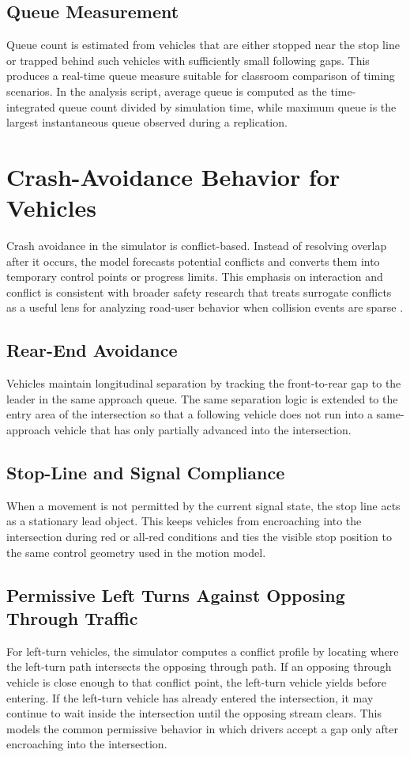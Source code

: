 \documentclass[conference]{IEEEtran}
\begin{document}
\subsection{Queue Measurement}
Queue count is estimated from vehicles that are either stopped near the stop line or trapped behind such vehicles with sufficiently small following gaps. This produces a real-time queue measure suitable for classroom comparison of timing scenarios. In the analysis script, average queue is computed as the time-integrated queue count divided by simulation time, while maximum queue is the largest instantaneous queue observed during a replication.

\section{Crash-Avoidance Behavior for Vehicles}
Crash avoidance in the simulator is conflict-based. Instead of resolving overlap after it occurs, the model forecasts potential conflicts and converts them into temporary control points or progress limits. This emphasis on interaction and conflict is consistent with broader safety research that treats surrogate conflicts as a useful lens for analyzing road-user behavior when collision events are sparse \cite{ni2016,zhang2020}.

\subsection{Rear-End Avoidance}
Vehicles maintain longitudinal separation by tracking the front-to-rear gap to the leader in the same approach queue. The same separation logic is extended to the entry area of the intersection so that a following vehicle does not run into a same-approach vehicle that has only partially advanced into the intersection.

\subsection{Stop-Line and Signal Compliance}
When a movement is not permitted by the current signal state, the stop line acts as a stationary lead object. This keeps vehicles from encroaching into the intersection during red or all-red conditions and ties the visible stop position to the same control geometry used in the motion model.

\subsection{Permissive Left Turns Against Opposing Through Traffic}
For left-turn vehicles, the simulator computes a conflict profile by locating where the left-turn path intersects the opposing through path. If an opposing through vehicle is close enough to that conflict point, the left-turn vehicle yields before entering. If the left-turn vehicle has already entered the intersection, it may continue to wait inside the intersection until the opposing stream clears. This models the common permissive behavior in which drivers accept a gap only after encroaching into the intersection.
\end{document}
